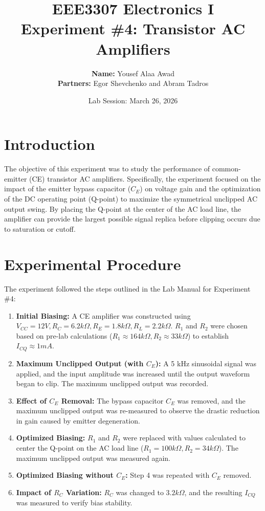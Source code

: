 \documentclass[12pt, letterpaper]{article}
\title{
    \vspace{1in}
    \textbf{\huge EEE3307 Electronics I} \\[0.5em]
    \textbf{\Large Experiment \#4: Transistor AC Amplifiers}
    \vspace{1.5in}
}
\author{
    \textbf{Name:} Yousef Alaa Awad \\
    \textbf{Partners:} Egor Shevchenko and Abram Tadros
}
\date{Lab Session: March 26, 2026}
\begin{document}
\maketitle
\newpage

\section{Introduction}
The objective of this experiment was to study the performance of common-emitter (CE) transistor AC amplifiers. Specifically, the experiment focused on the impact of the emitter bypass capacitor ($C_E$) on voltage gain and the optimization of the DC operating point (Q-point) to maximize the symmetrical unclipped AC output swing. By placing the Q-point at the center of the AC load line, the amplifier can provide the largest possible signal replica before clipping occurs due to saturation or cutoff.

\section{Experimental Procedure}
The experiment followed the steps outlined in the Lab Manual for Experiment \#4:
\begin{enumerate}
	\item \textbf{Initial Biasing:} A CE amplifier was constructed using $V_{CC}=12V, R_C=6.2k\Omega, R_E=1.8k\Omega, R_L=2.2k\Omega$. $R_1$ and $R_2$ were chosen based on pre-lab calculations ($R_1 \approx 164k\Omega, R_2 \approx 33k\Omega$) to establish $I_{CQ} \approx 1mA$.
	\item \textbf{Maximum Unclipped Output (with $C_E$):} A 5 kHz sinusoidal signal was applied, and the input amplitude was increased until the output waveform began to clip. The maximum unclipped output was recorded.
	\item \textbf{Effect of $C_E$ Removal:} The bypass capacitor $C_E$ was removed, and the maximum unclipped output was re-measured to observe the drastic reduction in gain caused by emitter degeneration.
	\item \textbf{Optimized Biasing:} $R_1$ and $R_2$ were replaced with values calculated to center the Q-point on the AC load line ($R_1 = 100k\Omega, R_2 = 34k\Omega$). The maximum unclipped output was measured again.
	\item \textbf{Optimized Biasing without $C_E$:} Step 4 was repeated with $C_E$ removed.
	\item \textbf{Impact of $R_C$ Variation:} $R_C$ was changed to $3.2k\Omega$, and the resulting $I_{CQ}$ was measured to verify bias stability.
\end{enumerate}
\end{document}
